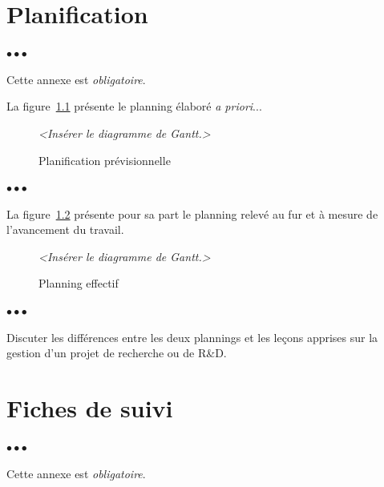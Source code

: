 \documentclass[11pt, french, screen, research-development]{report-rd-info}
\newenvironment{explanation}
{\color{blue}
 \begin{list}{}{\hspace{0.2\textwidth}\color{blue}}\item $\bullet\bullet\bullet$
}
{\end{list}}
\begin{document}
\chapter{Planification}

\begin{explanation}
   Cette annexe est \emph{obligatoire}.

   La figure~\ref{fig:PlanningPrevisionnel} présente le planning élaboré \emph{a priori}...
\end{explanation}

\begin{figure}
   \centering
      \emph{<Insérer le diagramme de Gantt.>}
   \caption{Planification prévisionnelle}
   \label{fig:PlanningPrevisionnel}
\end{figure}

\begin{explanation}
   La figure~\ref{fig:PlanningEffectif} présente pour sa part le planning relevé au fur et à mesure de l'avancement du travail.
\end{explanation}

\begin{figure}
   \centering
      \emph{<Insérer le diagramme de Gantt.>}
   \caption{Planning effectif}
   \label{fig:PlanningEffectif}
\end{figure}

\begin{explanation}
   Discuter les différences entre les deux plannings et les leçons apprises sur la gestion d'un projet de recherche ou de R\&D.
\end{explanation}

\chapter{Fiches de suivi}
\label{ann:FichesSuivi}

\begin{explanation}
   Cette annexe est \emph{obligatoire}.
\end{explanation}
\end{document}
